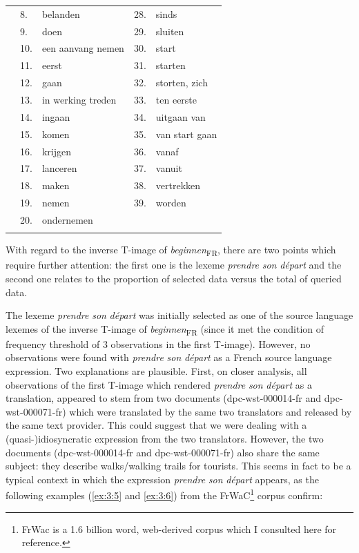 \begin{table}
\begin{tabularx}{\textwidth}{p{}lXlX}
\rowcolor{lsLightGray}& 8.& belanden & 28.& sinds\\
\rowcolor{lsLightGray}& 9.& doen & 29.& sluiten\\
\rowcolor{lsLightGray}& 10.& een aanvang nemen & 30.& start\\
\rowcolor{lsLightGray}& 11.& eerst & 31.& starten\\
\rowcolor{lsLightGray}& 12.& gaan & 32.& storten, zich\\
\rowcolor{lsLightGray}& 13.& in werking treden & 33.& ten eerste\\
\rowcolor{lsLightGray}& 14.& ingaan & 34.& uitgaan van\\
\rowcolor{lsLightGray}& 15.& komen & 35.& van start gaan\\
\rowcolor{lsLightGray}& 16.& krijgen & 36.& vanaf\\
\rowcolor{lsLightGray}& 17.& lanceren & 37.& vanuit\\
\rowcolor{lsLightGray}& 18.& maken & 38.& vertrekken\\
\rowcolor{lsLightGray}& 19.& nemen & 39.& worden\\
\rowcolor{lsLightGray}& 20.& ondernemen && \\
\lspbottomrule
\end{tabularx}
\end{table}

With regard to the inverse T-image of \textit{beginnen}\textsubscript{FR}, there are two points which require further attention: the first one is the lexeme \textit{prendre} \textit{son} \textit{départ} and the second one relates to the proportion of selected data versus the total of queried data.

The lexeme \textit{prendre} \textit{son} \textit{départ} was initially selected as one of the source language lexemes of the inverse T-image of \textit{beginnen}\textsubscript{FR} (since it met the condition of frequency threshold of 3 observations in the first T-image). However, no observations were found with \textit{prendre} \textit{son} \textit{départ} as a French source language expression. Two explanations are plausible. First, on closer analysis, all observations of the first T-image which rendered \textit{prendre} \textit{son} \textit{départ} as a translation, appeared to stem from two documents (dpc-wst-000014-fr and dpc-wst-000071-fr) which were translated by the same two translators and released by the same text provider. This could suggest that we were dealing with a \mbox{(quasi-)}idiosyncratic expression from the two translators. However, the two documents (dpc-wst-000014-fr and dpc-wst-000071-fr) also share the same subject: they describe walks\slash walk\-ing trails for tourists. This seems in fact to be a typical context in which the expression \textit{prendre} \textit{son} \textit{départ} appears, as the following examples (\ref{ex:3:5} and \ref{ex:3:6}) from the FrWaC\footnote{FrWac is a 1.6 billion word, web-derived corpus \citep{xiao_web_2010} which I consulted here for reference.} corpus confirm:\largerpage[-1]

